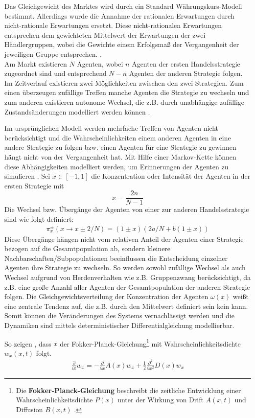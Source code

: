 \documentclass[ngerman]{ttlab-qualify}
\begin{document}
Das Gleichgewicht des Marktes wird durch ein Standard Währungskurs-Modell bestimmt. Allerdings wurde die Annahme der rationalen Erwartungen durch nicht-rationale Erwartungen ersetzt. Diese nicht-rationalen Erwartungen entsprechen dem gewichteten Mittelwert der Erwartungen der zwei Händlergruppen, wobei die Gewichte einem Erfolgsmaß der Vergangenheit der jeweiligen Gruppe entsprechen. \parencite{AL:2008}.\\

Am Markt existieren $N$ Agenten, wobei $n$ Agenten der ersten Handelsstrategie zugeordnet sind und entsprechend $N-n$ Agenten der anderen Strategie folgen. Im Zeitverlauf existieren zwei Möglichkeiten zwischen den zwei Strategien. Zum einen  überzeugen zufällige Treffen manche Agenten die Strategie zu wechseln und zum anderen existieren autonome Wechsel, die z.B. durch unabhängige zufällige Zustandsänderungen modelliert werden können \parencite{AL:2008}. 

Im ursprünglichen Modell werden mehrfache Treffen von Agenten nicht berücksichtigt und die Wahrscheinlichkeiten einem anderen Agenten in eine andere Strategie zu folgen bzw. einen Agenten für eine Strategie zu gewinnen hängt nicht von der Vergangenheit hat. Mit Hilfe einer Markov-Kette können diese Abhängigkeiten modelliert werden, um Erinnerungen der Agenten zu simulieren \parencite{AL:2008}. 
Sei $x\in [-1,1]$ die Konzentration oder Intensität der Agenten in der ersten Strategie mit
\[ x=\frac{2n}{N-1} \]
Die Wechsel bzw. Übergänge der Agenten von einer zur anderen Handelsstrategie sind wie folgt definiert:
\begin{align}
\pi_x^{\pm} (x \rightarrow x \pm 2/N) = (1\pm x)(2a/N + b(1\pm x)) 
\end{align}
Diese Übergänge hängen nicht vom relativen Anteil der Agenten einer Strategie bezogen auf die Gesamtpopulation ab, sondern kleinere Nachbarschaften/Subpopulationen beeinflussen die Entscheidung einzelner Agenten ihre Strategie zu wechseln. So werden sowohl zufällige Wechsel als auch Wechsel aufgrund von Herdenverhalten wie z.B. Gruppenzwang berücksichtigt, da z.B. eine große Anzahl aller Agenten der Gesamtpopulation der anderen Strategie folgen.
Die Gleichgewichtsverteilung der Konzentration der Agenten $\omega(x)$ weißt eine zentrale Tendenz auf, die z.B. durch den Mittelwert definiert sein kein kann.
Somit können die Veränderungen des Systems vernachlässigt werden und die Dynamiken sind mittels deterministischer Differentialgleichung modellierbar.

So zeigen \parencite{AL:2008}, dass $x$ der Fokker-Planck-Gleichung\footnote{Die \textbf{Fokker-Planck-Gleichung} beschreibt die zeitliche Entwicklung einer Wahrscheinlichkeitsdichte $P(x)$ unter der Wirkung von Drift $A(x,t)$ und Diffusion $B(x,t)$ \parencite{FokkerPlanck}.} mit Wahrscheinlichkeitsdichte $w_x(x,t)$ folgt. 
\begin{align}
\label{eq:AL-FP}
\frac{\partial}{\partial t}w_x = -\frac{\partial}{\partial x} A(x)w_x +\frac{1}{2}\frac{\partial^2}{\partial x^2} D(x)w_x 
\end{align}
\end{document}
